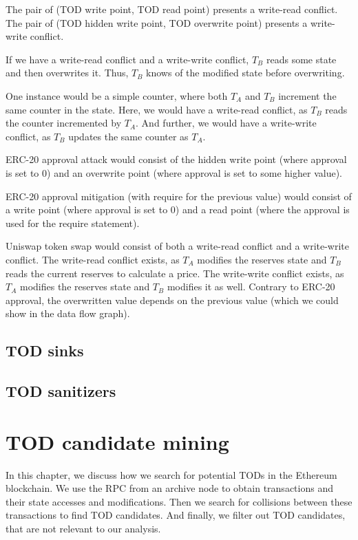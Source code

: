\documentclass[draft,final]{vutinfth} %
\begin{document}
    The pair of (TOD write point, TOD read point) presents a write-read conflict. The pair of (TOD hidden write point, TOD overwrite point) presents a write-write conflict.

    If we have a write-read conflict and a write-write conflict, $T_B$ reads some state and then overwrites it. Thus, $T_B$ knows of the modified state before overwriting.

    One instance would be a simple counter, where both $T_A$ and $T_B$ increment the same counter in the state. Here, we would have a write-read conflict, as $T_B$ reads the counter incremented by $T_A$. And further, we would have a write-write conflict, as $T_B$ updates the same counter as $T_A$.

    ERC-20 approval attack would consist of the hidden write point (where approval is set to 0) and an overwrite point (where approval is set to some higher value).

    ERC-20 approval mitigation (with require for the previous value) would consist of a write point (where approval is set to 0) and a read point (where the approval is used for the require statement).

    Uniswap token swap would consist of both a write-read conflict and a write-write conflict. The write-read conflict exists, as $T_A$ modifies the reserves state and $T_B$ reads the current reserves to calculate a price. The write-write conflict exists, as $T_A$ modifies the reserves state and $T_B$ modifies it as well. Contrary to ERC-20 approval, the overwritten value depends on the previous value (which we could show in the data flow graph).

    \section{TOD sinks}

    \section{TOD sanitizers}

\fi
\chapter{TOD candidate mining}

In this chapter, we discuss how we search for potential TODs in the Ethereum blockchain. We use the RPC from an archive node to obtain transactions and their state accesses and modifications. Then we search for collisions between these transactions to find TOD candidates. And finally, we filter out TOD candidates, that are not relevant to our analysis.
\end{document}
